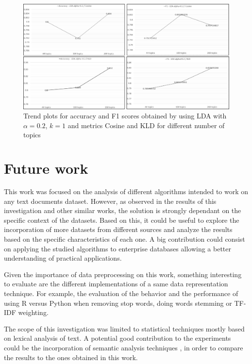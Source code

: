 \documentclass[preprint,12pt,3p]{elsarticle}
\begin{document}
\begin{figure}[h]
\caption{Trend plots for accuracy and F1 scores obtained by using LDA with $\alpha=0.2$, $k=1$ and metrics Cosine and KLD for different number of topics}
\label{figure-trend-plot}
\includegraphics[width=\textwidth]{trend_plot_LDA_more_topics}
\end{figure}


\section{Future work}
\label{future_work}

This work was focused on the analysis of different algorithms intended to work on any text documents dataset. However, as observed in the results of this investigation and other similar works, the solution is strongly dependant on the specific context of the datasets. Based on this, it could be useful to explore the incorporation of more datasets from different sources and analyze the results based on the specific characteristics of each one. A big contribution could consist on applying the studied algorithms to enterprise databases allowing a better understanding of practical applications.\par

Given the importance of data preprocessing on this work, something interesting to evaluate are the different implementations of a same data representation technique. For example, the evaluation of the behavior and the performance of using R versus Python when removing stop words, doing words stemming or TF-IDF weighting.\par

The scope of this investigation was limited to statistical techniques mostly based on lexical analysis of text. A potential good contribution to the experiments could be the incorporation of semantic analysis techniques \cite{seifzadeh2015short}, in order to compare the results to the ones obtained in this work.\par 
\end{document}
